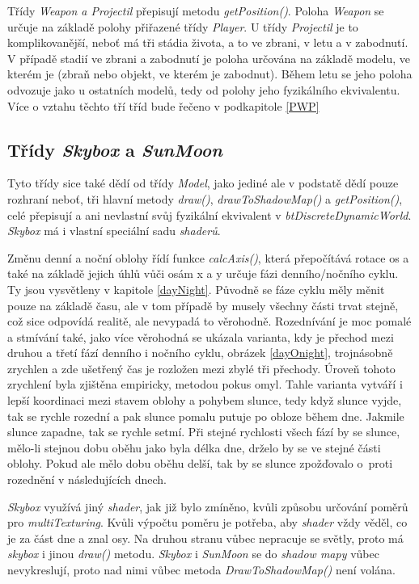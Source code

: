 Třídy \emph{Weapon a Projectil} přepisují metodu \emph{getPosition()}. Poloha \emph{Weapon} se určuje na základě polohy přiřazené třídy \emph{Player}. U třídy \emph{Projectil} je to komplikovanější, neboť má tři stádia života, a to ve zbrani, v letu a v zabodnutí. V případě stadií ve zbrani a zabodnutí je poloha určována na základě modelu, ve kterém je (zbraň nebo objekt, ve kterém je zabodnut). Během letu se jeho poloha odvozuje jako u ostatních modelů, tedy od polohy jeho fyzikálního ekvivalentu. Více o vztahu těchto tří tříd bude řečeno v podkapitole \ref{PWP}
\subsection{Třídy \emph{Skybox} a \emph{SunMoon}}
Tyto třídy sice také dědí od třídy \emph{Model}, jako jediné ale v podstatě dědí pouze rozhraní neboť, tři hlavní metody \emph{draw()}, \emph{drawToShadowMap()} a \emph{getPosition()}, celé přepisují a ani nevlastní svůj fyzikální ekvivalent v \emph{btDiscreteDynamicWorld}. \emph{Skybox} má i vlastní speciální sadu \emph{shaderů}.

Změnu denní a noční oblohy řídí funkce \emph{calcAxis()}, která přepočítává rotace os a také na základě jejich úhlů vůči osám x a y určuje fázi denního/nočního cyklu. Ty jsou vysvětleny v kapitole \ref{dayNight}. Původně se fáze cyklu měly měnit pouze na základě času, ale v tom případě by musely všechny části trvat stejně, což sice odpovídá realitě, ale nevypadá to věrohodně. Rozednívání je moc pomalé a stmívání také, jako více věrohodná  se ukázala varianta, kdy je přechod mezi druhou a třetí  fází denního i nočního cyklu, obrázek \ref{dayOnight}, trojnásobně zrychlen a zde ušetřený čas je rozložen mezi zbylé tři přechody. Úroveň tohoto zrychlení byla zjištěna empiricky, metodou pokus omyl. Tahle varianta vytváří i lepší koordinaci mezi stavem oblohy a pohybem slunce, tedy když slunce vyjde, tak se rychle rozední a pak slunce pomalu putuje po obloze během dne. Jakmile slunce zapadne, tak se rychle setmí. Při stejné rychlosti všech fází by se slunce, mělo-li stejnou dobu oběhu jako byla délka dne, drželo by se ve stejné části oblohy. Pokud ale mělo dobu oběhu delší, tak by se slunce zpožďovalo o~proti rozednění v následujících dnech. 

\emph{Skybox} využívá jiný \emph{shader}, jak již bylo zmíněno, kvůli způsobu určování poměrů pro \emph{multiTexturing}. Kvůli výpočtu poměru je potřeba, aby \emph{shader} vždy věděl, co je za část dne a znal osy. Na druhou stranu vůbec nepracuje se světly, proto má \emph{skybox} i jinou \emph{draw()} metodu. \emph{Skybox} i \emph{SunMoon} se do \emph{shadow mapy} vůbec nevykreslují, proto nad nimi vůbec metoda \emph{DrawToShadowMap()} není volána.

